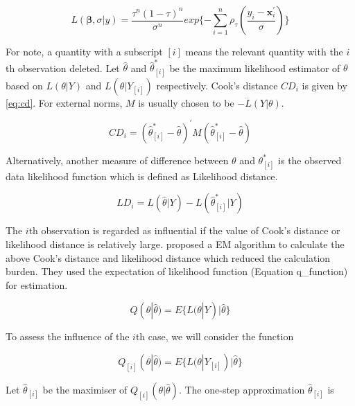 \documentclass[11pt,a4paper,]{article}
\theoremstyle{definition}
\theoremstyle{definition}
\theoremstyle{remark}
\begin{document}
\begin{equation}
L(\mathbf{\beta},\sigma|y)=\frac{\tau^{n}(1-\tau)^{n}}{\sigma^{n}}exp\{-\sum_{i=1}^{n} \rho_{\tau}(\frac{y_i-\boldsymbol{x}^{'}_{i}}{\sigma})\}
\label{eq:ald_likelihood}
\end{equation}

For note, a quantity with a subscript \([i]\) means the relevant
quantity with the \(i\)th observation deleted. Let \(\hat{\theta}\) and
\(\hat{\theta}^{*}_{[i]}\) be the maximum likelihood estimator of
\(\theta\) based on \(L(\theta|Y)\) and \(L(\theta|Y_{[i]})\)
respectively. Cook's distance \(CD_{i}\) is given by \eqref{eq:cd}. For
external norms, \(M\) is usually chosen to be \(-\ddot{L}(Y|\theta)\).

\begin{equation}
CD_{i}=(\hat{\theta}^{*}_{[i]}-\hat{\theta})^{'}M(\hat{\theta}^{*}_{[i]}-\hat{\theta})
\label{eq:cd}
\end{equation}

Alternatively, another measure of difference between \(\theta\) and
\(\theta^{*}_{[i]}\) is the observed data likelihood function which is
defined as Likelihood distance.

\begin{equation}
LD_i=L(\hat{\theta}|Y)-L(\hat{\theta}^{*}_{[i]}|Y)
\label{eq: ld}
\end{equation}

The \(i\)th observation is regarded as influential if the value of
Cook's distance or likelihood distance is relatively large.
\textcite{benites2015case} proposed a EM algorithm to calculate the
above Cook's distance and likelihood distance which reduced the
calculation burden. They used the expectation of likelihood function
(Equation q\_function) for estimation.

\begin{equation}
Q(\theta|\hat{\theta})=E\{L(\theta|Y)|\hat{\theta}\}
\label{eq:q_function}
\end{equation}

To assess the influence of the \(i\)th case, we will consider the
function

\begin{equation}
Q_{[i]}(\theta|\hat{\theta})=E\{L(\theta|Y_{[i]})|\hat{\theta}\}
\label{eq: q_one_deletion}
\end{equation}

Let \(\hat{\theta}_{[i]}\) be the maximiser of
\(Q_{[i]}(\theta|\hat{\theta})\). The one-step approximation
\(\hat{\theta}_{[i]}\) is
\end{document}
